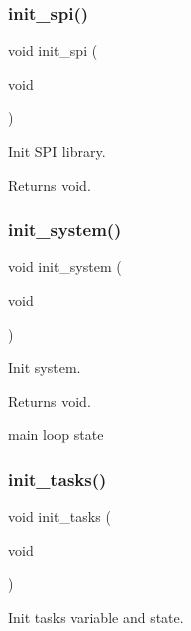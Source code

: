 \subsubsection{\texorpdfstring{init\+\_\+spi()}{init\_spi()}}
{\footnotesize\ttfamily void init\+\_\+spi (\begin{DoxyParamCaption}\item[{void}]{ }\end{DoxyParamCaption})}



Init S\+PI library. 

\begin{DoxyReturn}{Returns}
void. 
\end{DoxyReturn}
\mbox{\label{i2c-th_8h_a348d23d5899ce59d18975284dfb0afc0}} 
\subsubsection{\texorpdfstring{init\+\_\+system()}{init\_system()}}
{\footnotesize\ttfamily void init\+\_\+system (\begin{DoxyParamCaption}\item[{void}]{ }\end{DoxyParamCaption})}



Init system. 

\begin{DoxyReturn}{Returns}
void. 
\end{DoxyReturn}
main loop state \mbox{\label{i2c-th_8h_a2aae2290a141fddcea3fb6009acbb445}} 
\subsubsection{\texorpdfstring{init\+\_\+tasks()}{init\_tasks()}}
{\footnotesize\ttfamily void init\+\_\+tasks (\begin{DoxyParamCaption}\item[{void}]{ }\end{DoxyParamCaption})}



Init tasks variable and state. 

